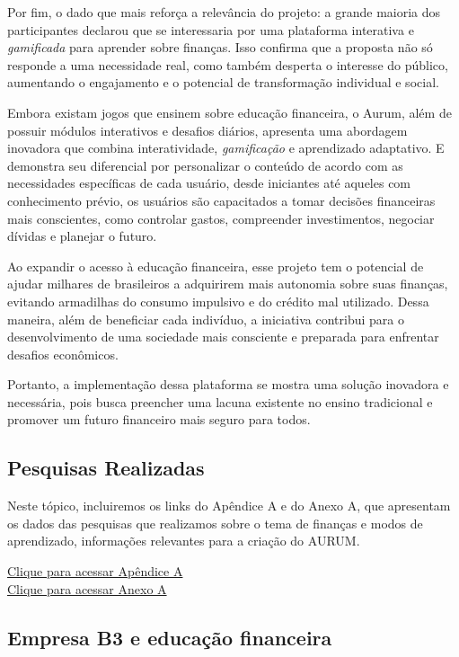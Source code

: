 \documentclass[
	article,			%
	12pt,				%
	oneside,			%
	a4paper,			%
	english,			%
	brazil,				%
	sumario=tradicional
	]{abntex2}
\begin{document}
    Por fim, o dado que mais reforça a relevância do projeto: a grande maioria dos participantes declarou que se interessaria por uma plataforma interativa e \textit{gamificada} para aprender sobre finanças. Isso confirma que a proposta não só responde a uma necessidade real, como também desperta o interesse do público, aumentando o engajamento e o potencial de transformação individual e social.

    Embora existam jogos que ensinem sobre educação financeira, o Aurum, além de possuir módulos interativos e desafios diários, apresenta uma abordagem inovadora que combina interatividade, \textit{gamificação} e aprendizado adaptativo. E demonstra seu diferencial por personalizar o conteúdo de acordo com as necessidades específicas de cada usuário, desde iniciantes até aqueles com conhecimento prévio, os usuários são capacitados a tomar decisões financeiras mais conscientes, como controlar gastos, compreender investimentos, negociar dívidas e planejar o futuro.
    
    Ao expandir o acesso à educação financeira, esse projeto tem o potencial de ajudar milhares de brasileiros a adquirirem mais autonomia sobre suas finanças, evitando armadilhas do consumo impulsivo e do crédito mal utilizado. Dessa maneira, além de beneficiar cada indivíduo, a iniciativa contribui para o desenvolvimento de uma sociedade mais consciente e preparada para enfrentar desafios econômicos.

    Portanto, a implementação dessa plataforma se mostra uma solução inovadora e necessária, pois busca preencher uma lacuna existente no ensino tradicional e promover um futuro financeiro mais seguro para todos.

\subsection{Pesquisas Realizadas}
\label{subsec:pesquisas}


Neste tópico, incluiremos os links do Apêndice A e do Anexo A, que apresentam os dados das pesquisas que realizamos sobre o tema de finanças e modos de aprendizado, informações relevantes para a criação do AURUM.

\noindent\hyperref[chap:apendiceA]{Clique para acessar Apêndice A} \\ 
\hyperref[chap:anexoA]{Clique para acessar Anexo A}



\subsection{Empresa B3 e educação financeira}
\end{document}
